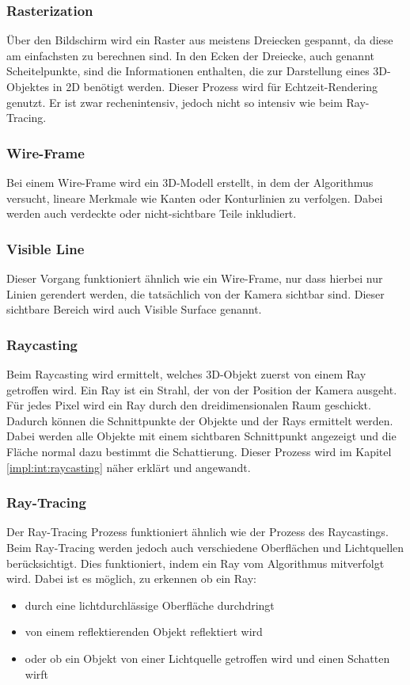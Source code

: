 \subsubsection{Rasterization}
Über den Bildschirm wird ein Raster aus meistens Dreiecken gespannt, da diese am einfachsten zu berechnen sind. In den Ecken der Dreiecke, auch genannt Scheitelpunkte, sind die Informationen enthalten, die zur Darstellung eines 3D-Objektes in 2D benötigt werden. Dieser Prozess wird für Echtzeit-Rendering genutzt. Er ist zwar rechenintensiv, jedoch nicht so intensiv wie beim Ray-Tracing. \cite{RayTracingRasterization}

\subsubsection{Wire-Frame}
Bei einem Wire-Frame wird ein 3D-Modell erstellt, in dem der Algorithmus versucht, lineare Merkmale wie Kanten oder Konturlinien zu verfolgen. Dabei werden auch verdeckte oder nicht-sichtbare Teile inkludiert. 
\cite{Rendering3DModels} 

\subsubsection{Visible Line}
Dieser Vorgang funktioniert ähnlich wie ein Wire-Frame, nur dass hierbei nur Linien gerendert werden, die tatsächlich von der Kamera sichtbar sind. Dieser sichtbare Bereich wird auch Visible Surface genannt. 
\cite{Rendering3DModels} 

\subsubsection{Raycasting}
\label{impl:rend:raycasting}
Beim Raycasting wird ermittelt, welches 3D-Objekt zuerst von einem Ray getroffen wird. Ein Ray ist ein Strahl, der von der Position der Kamera ausgeht. Für jedes Pixel wird ein Ray durch den dreidimensionalen Raum geschickt. Dadurch können die Schnittpunkte der Objekte und der Rays ermittelt werden. Dabei werden alle Objekte mit einem sichtbaren Schnittpunkt angezeigt und die Fläche normal dazu bestimmt die Schattierung. Dieser Prozess wird im Kapitel \ref{impl:int:raycasting} näher erklärt und angewandt.
\cite{Rendering3DModels} 

\subsubsection{Ray-Tracing}
Der Ray-Tracing Prozess funktioniert ähnlich wie der Prozess des Raycastings. Beim Ray-Tracing werden jedoch auch verschiedene Oberflächen und Lichtquellen berücksichtigt. Dies funktioniert, indem ein Ray vom Algorithmus mitverfolgt wird. Dabei ist es möglich, zu erkennen ob ein Ray:
\begin{itemize}
    \item durch eine lichtdurchlässige Oberfläche durchdringt
    \item von einem reflektierenden Objekt reflektiert wird
    \item oder ob ein Objekt von einer Lichtquelle getroffen wird und einen Schatten wirft
\end{itemize}
\cite{RayTracingRasterization}

